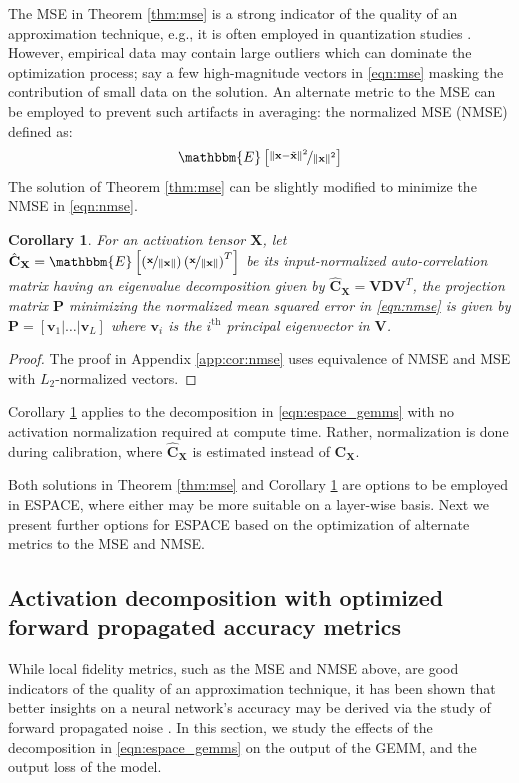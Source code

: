 \documentclass{article}
\theoremstyle{plain}
\newtheorem{corollary}[theorem]{Corollary}
\begin{document}
The MSE in Theorem \ref{thm:mse} is a strong indicator of the quality of an approximation technique, e.g., it is often employed in quantization studies \cite{sakr2022octav,wu2020integer}. However, empirical data may contain large outliers which can dominate the optimization process; say a few high-magnitude vectors in  \eqref{eqn:mse} masking the contribution of small data on the solution. An alternate metric to the MSE can be employed to prevent such artifacts in averaging: the normalized MSE (NMSE) defined as:
\begin{align}
    \label{eqn:nmse}
    \mathbbm{E}\left[\nicefrac{\lVert\mathbf{x}-\tilde{\mathbf{x}}\rVert^2}{\lVert\mathbf{x}\rVert^2}\right]
\end{align}
The solution of Theorem \ref{thm:mse} can be slightly modified to minimize the NMSE in \eqref{eqn:nmse}. 
\begin{corollary}
    \label{cor:nmse}
    For an activation tensor $\mathbf{X}$, let $\hat{\mathbf{C}}_{\mathbf{X}}=\mathbbm{E}\left[\left(\nicefrac{\mathbf{x}}{\lVert\mathbf{x}\rVert}\right)\left(\nicefrac{\mathbf{x}}{\lVert\mathbf{x}\rVert}\right)^T\right]$ be its input-normalized auto-correlation matrix having an eigenvalue decomposition given by $\hat{\mathbf{C}}_{\mathbf{X}} = \mathbf{V}\mathbf{D}\mathbf{V}^T$, the projection matrix $\mathbf{P}$ minimizing the normalized mean squared error in \eqref{eqn:nmse} is given by $\mathbf{P} = \left[\mathbf{v}_1 | \ldots | \mathbf{v}_L  \right]$ where $\mathbf{v}_i$ is the $i^\text{th}$ principal eigenvector in $\mathbf{V}$.
\end{corollary}
\begin{proof} The proof in Appendix \ref{app:cor:nmse} uses equivalence of NMSE and MSE with $L_2$-normalized vectors.
\end{proof}
Corollary \ref{cor:nmse} applies to the decomposition in \eqref{eqn:espace_gemms} with no activation normalization required at compute time. Rather, normalization is done during calibration, where $\hat{\mathbf{C}}_{\mathbf{X}}$ is estimated instead of $\mathbf{C}_{\mathbf{X}}$.

Both solutions in Theorem \ref{thm:mse} and Corollary \ref{cor:nmse} are options to be employed in ESPACE, where either may be more suitable on a layer-wise basis. Next we present further options for ESPACE based on the optimization of alternate metrics to the MSE and NMSE.

\subsection{Activation decomposition with optimized forward propagated accuracy metrics}
While local fidelity metrics, such as the MSE and NMSE above, are good indicators of the quality of an approximation technique, it has been shown that better insights on a neural network's accuracy may be derived via the study of forward propagated noise \cite{sakr2017analytical,sakr2018analytical,sakr2019per}. In this section, we study the effects of the decomposition in \eqref{eqn:espace_gemms} on the output of the GEMM, and the output loss of the model.
\end{document}
